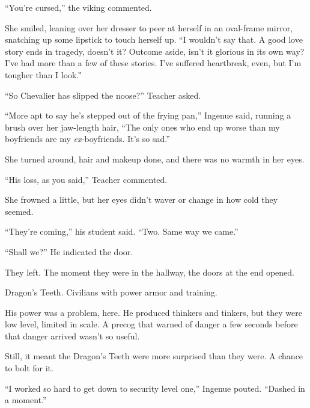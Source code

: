 ``You're cursed,'' the viking commented.



She smiled, leaning over her dresser to peer at herself in an oval-frame mirror, snatching up some lipstick to touch herself up.  ``I wouldn't say that.  A good love story ends in tragedy, doesn't it?  Outcome aside, isn't it glorious in its own way?  I've had more than a few of these stories.  I've suffered heartbreak, even, but I'm tougher than I look.''



``So Chevalier has slipped the noose?''  Teacher asked.



``More apt to say he's stepped out of the frying pan,'' Ingenue said, running a brush over her jaw-length hair, ``The only ones who end up worse than my boyfriends are my \emph{ex-}boyfriends.  It's so sad.''



She turned around, hair and makeup done, and there was no warmth in her eyes.



``His loss, as you said,'' Teacher commented.



She frowned a little, but her eyes didn't waver or change in how cold they seemed.



``They're coming,'' his student said.  ``Two.  Same way we came.''



``Shall we?''  He indicated the door.



They left.  The moment they were in the hallway, the doors at the end opened.



Dragon's Teeth.  Civilians with power armor and training.



His power was a problem, here.  He produced thinkers and tinkers, but they were low level, limited in scale.  A precog that warned of danger a few seconds before that danger arrived wasn't so useful.



Still, it meant the Dragon's Teeth were more surprised than they were.  A chance to bolt for it.



``I worked so hard to get down to security level one,'' Ingenue pouted.  ``Dashed in a moment.''



